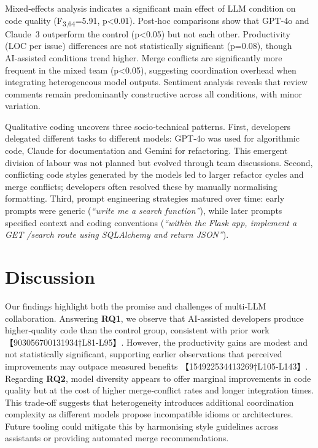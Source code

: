 \documentclass[conference]{IEEEtran}
\begin{document}
Mixed‑effects analysis indicates a significant main effect of LLM condition on code quality (F\textsubscript{3,64}=5.91, p<0.01).  Post‑hoc comparisons show that GPT‑4o and Claude 3 outperform the control (p<0.05) but not each other.  Productivity (LOC per issue) differences are not statistically significant (p=0.08), though AI‑assisted conditions trend higher.  Merge conflicts are significantly more frequent in the mixed team (p<0.05), suggesting coordination overhead when integrating heterogeneous model outputs.  Sentiment analysis reveals that review comments remain predominantly constructive across all conditions, with minor variation.

Qualitative coding uncovers three socio‑technical patterns.  First, developers delegated different tasks to different models: GPT‑4o was used for algorithmic code, Claude for documentation and Gemini for refactoring.  This emergent division of labour was not planned but evolved through team discussions.  Second, conflicting code styles generated by the models led to larger refactor cycles and merge conflicts; developers often resolved these by manually normalising formatting.  Third, prompt engineering strategies matured over time: early prompts were generic (\emph{“write me a search function”}), while later prompts specified context and coding conventions (\emph{“within the Flask app, implement a GET /search route using SQLAlchemy and return JSON”}).

\section{Discussion}
Our findings highlight both the promise and challenges of multi‑LLM collaboration.  Answering \textbf{RQ1}, we observe that AI‑assisted developers produce higher‑quality code than the control group, consistent with prior work 【903056700131934†L81-L95】.  However, the productivity gains are modest and not statistically significant, supporting earlier observations that perceived improvements may outpace measured benefits 【154922534413269†L105-L143】.  Regarding \textbf{RQ2}, model diversity appears to offer marginal improvements in code quality but at the cost of higher merge‑conflict rates and longer integration times.  This trade‑off suggests that heterogeneity introduces additional coordination complexity as different models propose incompatible idioms or architectures.  Future tooling could mitigate this by harmonising style guidelines across assistants or providing automated merge recommendations.
\end{document}

